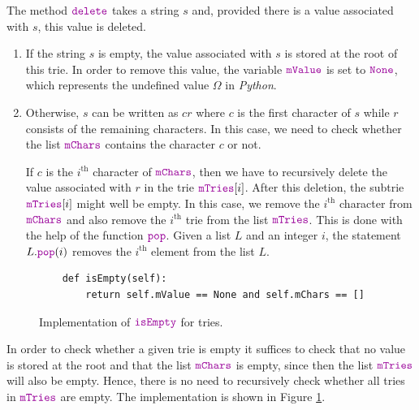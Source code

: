 The method $\mytt{delete}$ takes a string $s$ and, provided there is a value associated with $s$, this
value is deleted.
\begin{enumerate}
\item If the string $s$ is empty, the value associated with $s$ is stored at the root of this trie.
      In order to remove this value, the variable $\mytt{mValue}$ is set to $\mytt{None}$, which represents
      the undefined value $\Omega$ in \textsl{Python}.
\item Otherwise, $s$ can be written as $cr$ where $c$ is the first character of $s$ while $r$
      consists of the remaining characters.  In this case, we need to check whether the list
      $\mytt{mChars}$ contains the character $c$ or not.
 
      If $c$ is the $i^\textrm{th}$ character of $\mytt{mChars}$, then we have to recursively
      delete the value associated with $r$ in the trie $\mytt{mTries}[i]$.  
      After this deletion, the subtrie  $\mytt{mTries}[i]$ might well be empty.  In this case,
      we remove the $i^\textrm{th}$ character from $\mytt{mChars}$ and also remove the $i^\textrm{th}$ trie from the list
      $\mytt{mTries}$.  This is done with the help of the function $\mytt{pop}$.
      Given a list $L$ and an integer $i$, the statement $L.\mytt{pop}(i)$ removes the $i^\textrm{th}$ element from
      the list $L$.
\end{enumerate}

\begin{figure}[!ht]
\centering
\begin{verbatim}
    def isEmpty(self):
        return self.mValue == None and self.mChars == []
\end{verbatim}
\vspace*{-0.3cm}
\caption{Implementation of $\mytt{isEmpty}$ for tries.}
\label{fig:trie.ipython-isEmpty}
\end{figure}

In order to check whether a given trie is empty it suffices to check that no value is stored at the root
and that the list $\mytt{mChars}$ is empty, since then the list $\mytt{mTries}$ will also be empty.  Hence,
there is no need to recursively check whether all tries in $\mytt{mTries}$ are empty.  
The implementation is shown in Figure \ref{fig:trie.ipython-isEmpty}.

